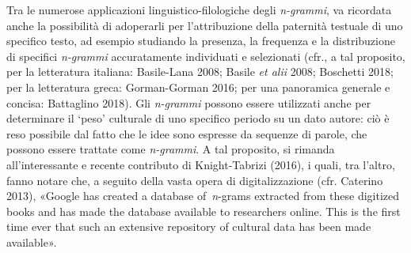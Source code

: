Tra le numerose applicazioni linguistico-filologiche degli
\emph{n-grammi}, va ricordata anche la possibilità di adoperarli per
l'attribuzione della paternità testuale di uno specifico testo, ad
esempio studiando la presenza, la frequenza e la distribuzione di
specifici \emph{n-grammi} accuratamente individuati e selezionati (cfr.,
a tal proposito, per la letteratura italiana: Basile-Lana 2008; Basile
\emph{et alii} 2008; Boschetti 2018; per la letteratura greca:
Gorman-Gorman 2016; per una panoramica generale e concisa: Battaglino
2018). Gli \emph{n-grammi} possono essere utilizzati anche per
determinare il `peso' culturale di uno specifico periodo su un dato
autore: ciò è reso possibile dal fatto che le idee sono espresse da
sequenze di parole, che possono essere trattate come \emph{n-grammi}. A
tal proposito, si rimanda all'interessante e recente contributo di
Knight-Tabrizi (2016), i quali, tra l'altro, fanno notare che, a seguito
della vasta opera di digitalizzazione (cfr. Caterino 2013), «Google has
created a database of~\emph{n}-grams extracted from these digitized
books and has made the database available to researchers online. This is
the first time ever that such an extensive repository of cultural data
has been made available».

